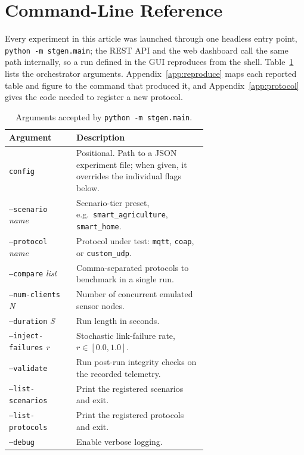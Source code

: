 \documentclass[jsan,article,submit,moreauthors,pdftex]{Definitions/mdpi}
\begin{document}
\appendixstart
\appendix
\section{Command-Line Reference}
\label{sec:appendix_cli}

Every experiment in this article was launched through one headless entry point, \texttt{python -m stgen.main}; the REST API and the web dashboard call the same path internally, so a run defined in the GUI reproduces from the shell. Table~\ref{tab:cli_options} lists the orchestrator arguments. Appendix~\ref{app:reproduce} maps each reported table and figure to the command that produced it, and Appendix~\ref{app:protocol} gives the code needed to register a new protocol.

\begin{table}[htbp]
\centering
\caption{Arguments accepted by \texttt{python -m stgen.main}.}
\label{tab:cli_options}
\small
\begin{tabular}{@{}lp{0.66\linewidth}@{}}
\toprule
\textbf{Argument} & \textbf{Description} \\ \midrule
\texttt{config} & Positional. Path to a JSON experiment file; when given, it overrides the individual flags below. \\
\texttt{--scenario} \textit{name} & Scenario-tier preset, e.g.\ \texttt{smart\_agriculture}, \texttt{smart\_home}. \\
\texttt{--protocol} \textit{name} & Protocol under test: \texttt{mqtt}, \texttt{coap}, or \texttt{custom\_udp}. \\
\texttt{--compare} \textit{list} & Comma-separated protocols to benchmark in a single run. \\
\texttt{--num-clients} \textit{N} & Number of concurrent emulated sensor nodes. \\
\texttt{--duration} \textit{S} & Run length in seconds. \\
\texttt{--inject-failures} \textit{r} & Stochastic link-failure rate, $r \in [0.0, 1.0]$. \\
\texttt{--validate} & Run post-run integrity checks on the recorded telemetry. \\
\texttt{--list-scenarios} & Print the registered scenarios and exit. \\
\texttt{--list-protocols} & Print the registered protocols and exit. \\
\texttt{--debug} & Enable verbose logging. \\
\bottomrule
\end{tabular}
\end{table}
\end{document}

